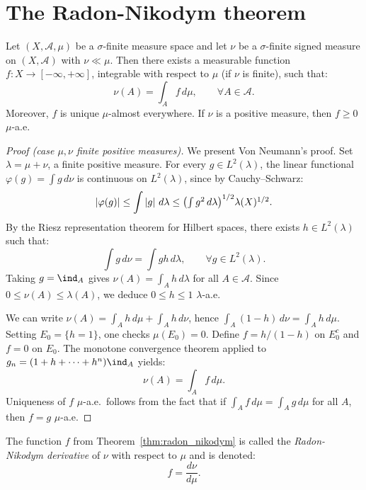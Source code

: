 \section{The Radon-Nikodym theorem}

\begin{theorem}
\label{thm:radon_nikodym}
Let $(X, \mathcal{A}, \mu)$ be a $\sigma$-finite measure space and let $\nu$ be a
$\sigma$-finite signed measure on $(X, \mathcal{A})$ with $\nu \ll \mu$. Then there
exists a measurable function $f : X \to [-\infty, +\infty]$, integrable with respect
to $\mu$ (if $\nu$ is finite), such that:
\[
    \nu(A) = \int_A f\, d\mu, \qquad \forall A \in \mathcal{A}.
\]
Moreover, $f$ is unique $\mu$-almost everywhere. If $\nu$ is a positive measure, then
$f \geq 0$ $\mu$-a.e.
\end{theorem}

\begin{proof}[Proof (case $\mu, \nu$ finite positive measures)]
We present Von Neumann's proof. Set $\lambda = \mu + \nu$, a finite positive measure.
For every $g \in L^2(\lambda)$, the linear functional
$\varphi(g) = \int g\, d\nu$ is continuous on $L^2(\lambda)$, since by
Cauchy--Schwarz:
\[
    \left| \varphi(g) \right| \leq \int \left| g \right|\, d\lambda
    \leq \bigl(\textstyle\int g^2\, d\lambda\bigr)^{1/2} \lambda(X)^{1/2}.
\]
By the Riesz representation theorem for Hilbert spaces, there exists
$h \in L^2(\lambda)$ such that:
\[
    \int g\, d\nu = \int gh\, d\lambda, \qquad \forall g \in L^2(\lambda).
\]
Taking $g = \ind_A$ gives $\nu(A) = \int_A h\, d\lambda$ for all
$A \in \mathcal{A}$. Since $0 \leq \nu(A) \leq \lambda(A)$, we deduce
$0 \leq h \leq 1$ $\lambda$-a.e.

We can write $\nu(A) = \int_A h\, d\mu + \int_A h\, d\nu$, hence
$\int_A (1-h)\, d\nu = \int_A h\, d\mu$. Setting $E_0 = \{h = 1\}$, one checks
$\mu(E_0) = 0$. Define $f = h/(1-h)$ on $E_0^c$ and $f = 0$ on $E_0$. The monotone
convergence theorem applied to $g_n = (1 + h + \cdots + h^n)\ind_A$ yields:
\[
    \nu(A) = \int_A f\, d\mu.
\]
Uniqueness of $f$ $\mu$-a.e.\ follows from the fact that if $\int_A f\, d\mu =
\int_A g\, d\mu$ for all $A$, then $f = g$ $\mu$-a.e.
\end{proof}

\begin{definition}
The function $f$ from Theorem~\ref{thm:radon_nikodym} is called the
\emph{Radon-Nikodym derivative} of $\nu$ with respect to $\mu$ and is denoted:
\[
    f = \frac{d\nu}{d\mu}.
\]
\end{definition}

